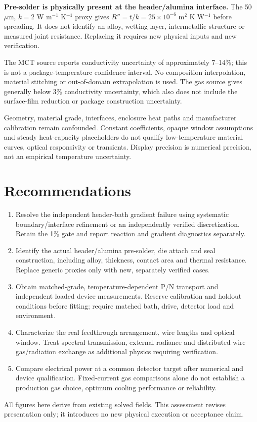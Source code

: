 \documentclass[11pt,a4paper]{article}
\begin{document}
\textbf{Pre-solder is physically present at the header/alumina interface.}
The 50 $\mu$m, $k=2$ W m$^{-1}$ K$^{-1}$ proxy gives
$R''=t/k=25\times10^{-6}$ m$^2$ K W$^{-1}$ before spreading. It does not identify
an alloy, wetting layer, intermetallic structure or measured joint resistance.
Replacing it requires new physical inputs and new verification.

The MCT source reports conductivity uncertainty of approximately 7--14\%; this
is not a package-temperature confidence interval. No composition interpolation,
material stitching or out-of-domain extrapolation is used. The gas source gives
generally below 3\% conductivity uncertainty, which also does not include the
surface-film reduction or package construction uncertainty.

Geometry, material grade, interfaces, enclosure heat paths and manufacturer
calibration remain confounded. Constant coefficients, opaque window assumptions
and steady heat-capacity placeholders do not qualify low-temperature material
curves, optical responsivity or transients. Display precision is numerical
precision, not an empirical temperature uncertainty.
\clearpage
\section{Recommendations}
\begin{enumerate}
\item Resolve the independent header-bath gradient failure using systematic
boundary/interface refinement or an independently verified discretization.
Retain the 1\% gate and report reaction and gradient diagnostics separately.
\item Identify the actual header/alumina pre-solder, die attach and seal
construction, including alloy, thickness, contact area and thermal resistance.
Replace generic proxies only with new, separately verified cases.
\item Obtain matched-grade, temperature-dependent P/N transport and independent
loaded device measurements. Reserve calibration and holdout conditions before
fitting; require matched bath, drive, detector load and environment.
\item Characterize the real feedthrough arrangement, wire lengths and optical
window. Treat spectral transmission, external radiance and distributed wire
gas/radiation exchange as additional physics requiring verification.
\item Compare electrical power at a common detector target after numerical and
device qualification. Fixed-current gas comparisons alone do not establish a
production gas choice, optimum cooling performance or reliability.
\end{enumerate}
All figures here derive from existing solved fields. This assessment revises
presentation only; it introduces no new physical execution or acceptance claim.
\end{document}
